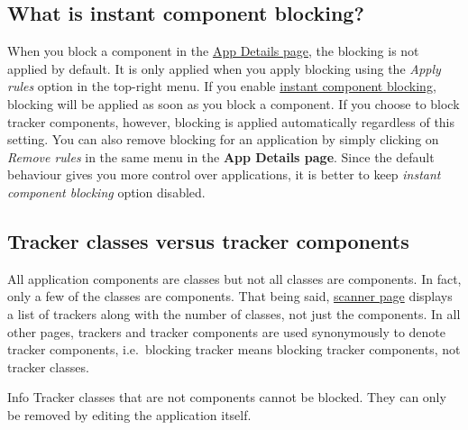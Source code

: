 \subsection{What is instant component blocking?}\label{subsec:faq:what-is-instant-component-blocking} %
When you block a component in the \hyperref[sec:app-details-page]{App Details page}, the blocking is not applied by
default. It is only applied when you apply blocking using the \textit{Apply rules} option in the top-right menu. If you
enable \hyperref[subsubsec:instant-component-blocking]{instant component blocking}, blocking will be applied as soon as you block a component.
If you choose to block tracker components, however, blocking is applied automatically regardless of this setting.
You can also remove blocking for an application by simply clicking on \textit{Remove rules} in the same menu in the \textbf{App Details page}.
Since the default behaviour gives you more control over applications, it is better to keep \textit{instant component blocking} option disabled.

\subsection{Tracker classes versus tracker components}\label{subsec:tracker-classes-versus-tracker-components} %
All application components are classes but not all classes are components. In fact, only a few of the classes are components.
That being said, \hyperref[sec:scanner-page]{scanner page} displays a list of trackers along with the number of classes,
not just the components. In all other pages, trackers and tracker components are used synonymously to denote tracker
components, i.e.\ blocking tracker means blocking tracker components, not tracker classes.

\begin{tip}{Info}
    Tracker classes that are not components cannot be blocked. They can only be removed by editing the application itself.
\end{tip}
